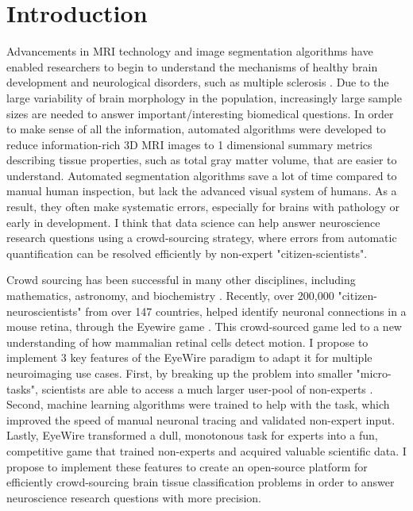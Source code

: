 \section[!]{Introduction}

Advancements in MRI technology and image segmentation algorithms have enabled researchers to begin to understand the mechanisms of healthy brain development \cite{giedd1999brain} and neurological disorders, such as multiple sclerosis \cite{bakshi2008mri}. Due to the large variability of brain morphology in the population, increasingly large sample sizes are needed to answer important/interesting biomedical questions. In order to make sense of all the information, automated algorithms were developed to reduce information-rich 3D MRI images to 1 dimensional summary metrics describing tissue properties, such as total gray matter volume, that are easier to understand. Automated  segmentation algorithms save a lot of time compared to manual human inspection, but lack the advanced visual system of humans. As a result, they often make systematic errors, especially for brains with pathology or early in development. I think that data science can help answer neuroscience research questions using a crowd-sourcing strategy, where errors from automatic quantification can be resolved efficiently by non-expert "citizen-scientists".

Crowd sourcing has been successful in many other disciplines, including mathematics, astronomy, and biochemistry \cite{wiggins2011conservation}. Recently, over 200,000 "citizen-neuroscientists"  from over 147 countries, helped identify neuronal connections in a mouse retina, through the Eyewire game \cite{kim2014space}. This crowd-sourced game led to a new understanding of how mammalian retinal cells detect motion. I propose to implement 3 key features of the EyeWire paradigm to adapt it for multiple neuroimaging use cases. First, by breaking up the problem into smaller "micro-tasks", scientists are able to access a much larger user-pool of non-experts \cite{kittur2008crowdsourcing}. Second, machine learning algorithms were trained to help with the task, which improved the speed of manual neuronal tracing and validated non-expert input. Lastly, EyeWire transformed a dull, monotonous task for experts into a fun, competitive game that trained non-experts and acquired valuable scientific data. I propose to implement these features to create an open-source platform for efficiently crowd-sourcing brain tissue classification problems in order to answer neuroscience research questions with more precision.


